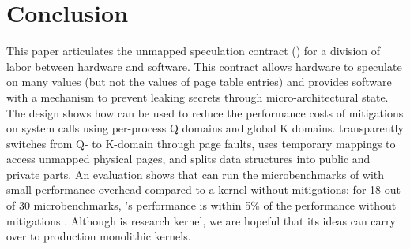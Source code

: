 \section*{Conclusion}
\label{s:concl}

This paper articulates the unmapped speculation contract (\contract)
for a division of labor between hardware and software.  This contract
allows hardware to speculate on many values (but not the values of
page table entries) and provides software with a mechanism to prevent
leaking secrets through micro-architectural state.  The \sys design
shows how \contract can be used to reduce the performance costs of
mitigations on system calls using per-process Q domains and global K
domains.  \sys transparently switches from Q- to K-domain through page
faults, uses temporary mappings to access unmapped physical pages, and
splits data structures into public and private parts.  An evaluation
shows that \sys can run the microbenchmarks of \bench with small
performance overhead compared to a kernel without mitigations: for
18 out of 30 \bench microbenchmarks, \sys's performance is within 5\%
of the performance without mitigations
.  Although \sys is research kernel, we are hopeful that its
ideas can carry over to production monolithic kernels.
